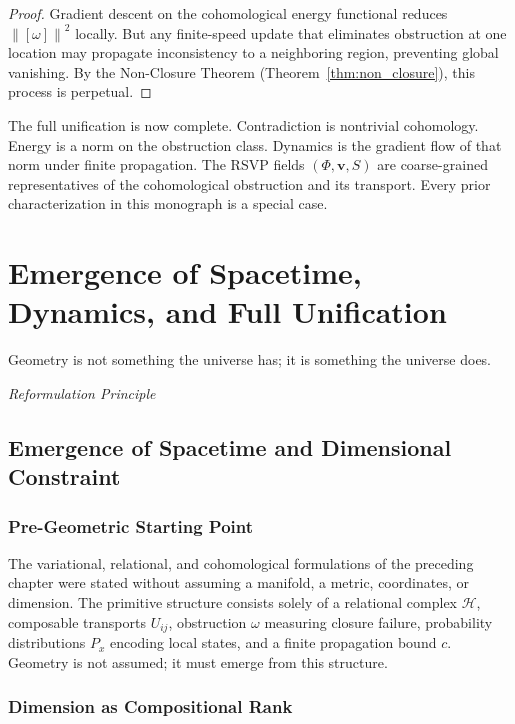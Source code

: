 \documentclass[12pt,a4paper,openany]{book}
\theoremstyle{plain}
\theoremstyle{definition}
\theoremstyle{remark}
\newcommand{\norm}[1]{\left\|#1\right\|}
\begin{document}
\begin{proof}
Gradient descent on the cohomological energy functional reduces $\norm{[\omega]}^2$ locally. But any finite-speed update that eliminates obstruction at one location may propagate inconsistency to a neighboring region, preventing global vanishing. By the Non-Closure Theorem (Theorem~\ref{thm:non_closure}), this process is perpetual.
\end{proof}

The full unification is now complete. Contradiction is nontrivial cohomology. Energy is a norm on the obstruction class. Dynamics is the gradient flow of that norm under finite propagation. The RSVP fields $(\Phi,\mathbf{v},S)$ are coarse-grained representatives of the cohomological obstruction and its transport. Every prior characterization in this monograph is a special case.

\chapter{Emergence of Spacetime, Dynamics, and Full Unification}
\label{chap:emergence_and_unification}

\epigraph{%
  Geometry is not something the universe has;
  it is something the universe does.
}{%
  \textit{Reformulation Principle}}

\section{Emergence of Spacetime and Dimensional Constraint}
\label{sec:spacetime_emergence}

\subsection{Pre-Geometric Starting Point}

The variational, relational, and cohomological formulations of the preceding chapter were stated without assuming a manifold, a metric, coordinates, or dimension. The primitive structure consists solely of a relational complex $\mathcal{H}$, composable transports $U_{ij}$, obstruction $\omega$ measuring closure failure, probability distributions $P_x$ encoding local states, and a finite propagation bound $c$. Geometry is not assumed; it must emerge from this structure.

\subsection{Dimension as Compositional Rank}
\end{document}
